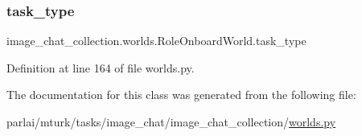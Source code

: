\subsubsection{\texorpdfstring{task\+\_\+type}{task\_type}}
{\footnotesize\ttfamily image\+\_\+chat\+\_\+collection.\+worlds.\+Role\+Onboard\+World.\+task\+\_\+type}



Definition at line 164 of file worlds.\+py.



The documentation for this class was generated from the following file\+:\begin{DoxyCompactItemize}
\item 
parlai/mturk/tasks/image\+\_\+chat/image\+\_\+chat\+\_\+collection/\hyperlink{parlai_2mturk_2tasks_2image__chat_2image__chat__collection_2worlds_8py}{worlds.\+py}\end{DoxyCompactItemize}
